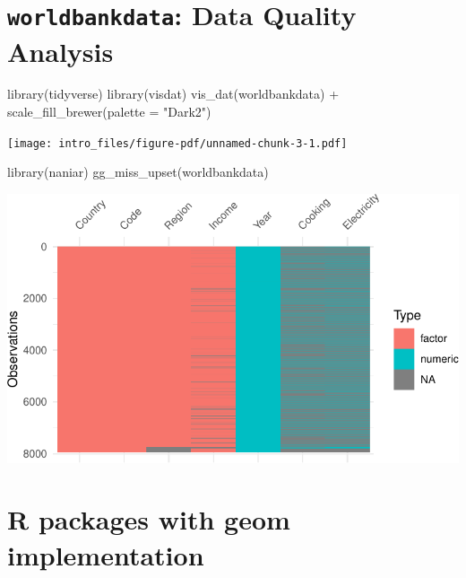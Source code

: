 \documentclass[
  letterpaper,
  DIV=11,
  numbers=noendperiod]{scrreprt}
\newenvironment{Shaded}{\begin{snugshade}}{\end{snugshade}}
\newcommand{\AttributeTok}[1]{\textcolor[rgb]{0.40,0.45,0.13}{#1}}
\newcommand{\FunctionTok}[1]{\textcolor[rgb]{0.28,0.35,0.67}{#1}}
\newcommand{\NormalTok}[1]{\textcolor[rgb]{0.00,0.23,0.31}{#1}}
\newcommand{\SpecialCharTok}[1]{\textcolor[rgb]{0.37,0.37,0.37}{#1}}
\newcommand{\StringTok}[1]{\textcolor[rgb]{0.13,0.47,0.30}{#1}}
\begin{document}
\section*{\texorpdfstring{\texttt{worldbankdata}: Data Quality
Analysis}{worldbankdata: Data Quality Analysis}}\label{worldbankdata-data-quality-analysis}


\begin{Shaded}
\begin{Highlighting}[]
\FunctionTok{library}\NormalTok{(tidyverse)}
\FunctionTok{library}\NormalTok{(visdat)}
\FunctionTok{vis\_dat}\NormalTok{(worldbankdata) }\SpecialCharTok{+} 
  \FunctionTok{scale\_fill\_brewer}\NormalTok{(}\AttributeTok{palette =} \StringTok{"Dark2"}\NormalTok{)}
\end{Highlighting}
\end{Shaded}

\texttt{[image: intro\_files/figure-pdf/unnamed-chunk-3-1.pdf]}

\begin{Shaded}
\begin{Highlighting}[]
\FunctionTok{library}\NormalTok{(naniar)}
\FunctionTok{gg\_miss\_upset}\NormalTok{(worldbankdata) }
\end{Highlighting}
\end{Shaded}

\includegraphics{intro_files/figure-pdf/unnamed-chunk-4-1.pdf}

\section*{R packages with geom
implementation}\label{r-packages-with-geom-implementation}
\end{document}
